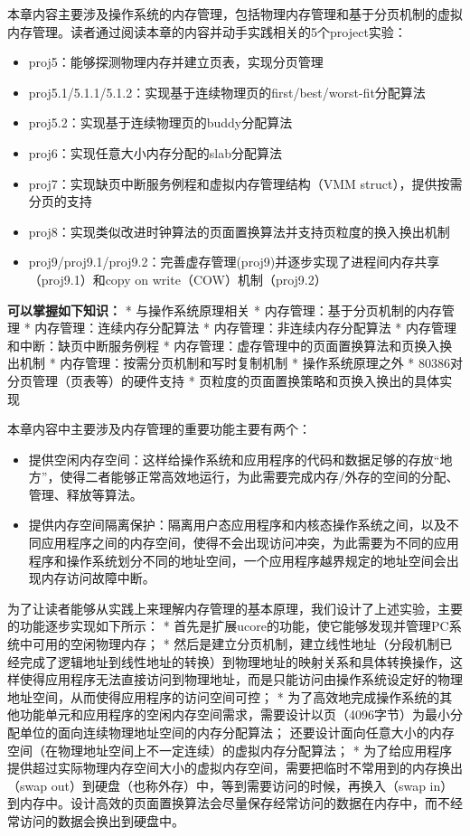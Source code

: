 本章内容主要涉及操作系统的内存管理，包括物理内存管理和基于分页机制的虚拟内存管理。读者通过阅读本章的内容并动手实践相关的5个project实验：

\begin{itemize}
\tightlist
\item
  proj5：能够探测物理内存并建立页表，实现分页管理
\item
  proj5.1/5.1.1/5.1.2：实现基于连续物理页的first/best/worst-fit分配算法
\item
  proj5.2：实现基于连续物理页的buddy分配算法
\item
  proj6：实现任意大小内存分配的slab分配算法
\item
  proj7：实现缺页中断服务例程和虚拟内存管理结构（VMM
  struct），提供按需分页的支持
\item
  proj8：实现类似改进时钟算法的页面置换算法并支持页粒度的换入换出机制
\item
  proj9/proj9.1/proj9.2：完善虚存管理(proj9)并逐步实现了进程间内存共享（proj9.1）和copy
  on write（COW）机制（proj9.2）
\end{itemize}

\textbf{可以掌握如下知识：} * 与操作系统原理相关 *
内存管理：基于分页机制的内存管理 * 内存管理：连续内存分配算法 *
内存管理：非连续内存分配算法 * 内存管理和中断：缺页中断服务例程 *
内存管理：虚存管理中的页面置换算法和页换入换出机制 *
内存管理：按需分页机制和写时复制机制 * 操作系统原理之外 *
80386对分页管理（页表等）的硬件支持 *
页粒度的页面置换策略和页换入换出的具体实现

本章内容中主要涉及内存管理的重要功能主要有两个：

\begin{itemize}
\tightlist
\item
  提供空闲内存空间：这样给操作系统和应用程序的代码和数据足够的存放``地方''，使得二者能够正常高效地运行，为此需要完成内存/外存的空间的分配、管理、释放等算法。
\item
  提供内存空间隔离保护：隔离用户态应用程序和内核态操作系统之间，以及不同应用程序之间的内存空间，使得不会出现访问冲突，为此需要为不同的应用程序和操作系统划分不同的地址空间，一个应用程序越界规定的地址空间会出现内存访问故障中断。
\end{itemize}

为了让读者能够从实践上来理解内存管理的基本原理，我们设计了上述实验，主要的功能逐步实现如下所示：
* 首先是扩展ucore的功能，使它能够发现并管理PC系统中可用的空闲物理内存；
*
然后是建立分页机制，建立线性地址（分段机制已经完成了逻辑地址到线性地址的转换）到物理地址的映射关系和具体转换操作，这样使得应用程序无法直接访问到物理地址，而是只能访问由操作系统设定好的物理地址空间，从而使得应用程序的访问空间可控；
*
为了高效地完成操作系统的其他功能单元和应用程序的空闲内存空间需求，需要设计以页（4096字节）为最小分配单位的面向连续物理地址空间的内存分配算法；
还要设计面向任意大小的内存空间（在物理地址空间上不一定连续）的虚拟内存分配算法；
*
为了给应用程序提供超过实际物理内存空间大小的虚拟内存空间，需要把临时不常用到的内存换出（swap
out）到硬盘（也称外存）中，等到需要访问的时候，再换入（swap
in）到内存中。设计高效的页面置换算法会尽量保存经常访问的数据在内存中，而不经常访问的数据会换出到硬盘中。
